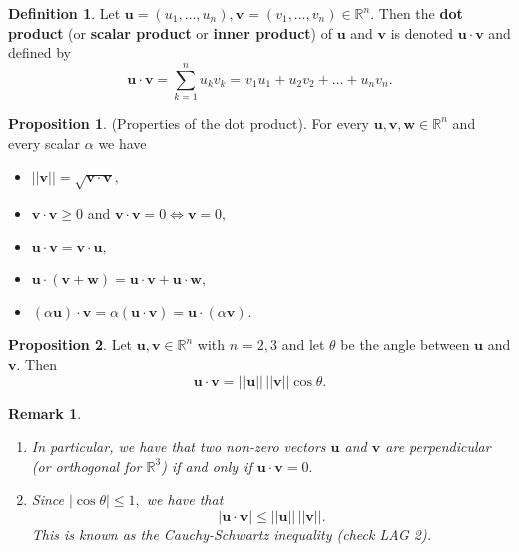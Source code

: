 \documentclass[12pt, a4paper]{article}
\newtheorem*{remark}{Remark}
\theoremstyle{definition}
\newtheorem{definition}{Definition}[section]
\newtheorem{proposition}{Proposition}
\theoremstyle{plain}
\newcommand{\bb}[1]{\mathbb{#1}}
\newcommand{\vect}[1]{\mathbf{#1}}
\begin{document}
\begin{definition} Let $\vect{u}=(u_1,\ldots,u_n), \vect{v}=(v_1,\ldots,v_n) \in \bb{R}^n.$ Then the \textbf{dot product} (or \textbf{scalar product} or \textbf{inner product}) of $\vect{u}$ and $\vect{v}$ is denoted $\vect{u}\cdot \vect{v}$ and defined by $$\vect{u}\cdot\vect{v} = \sum_{k=1}^{n}u_kv_k =v_1u_1+u_2v_2+\ldots+u_nv_n.$$ \end{definition}

\begin{proposition} (Properties of the dot product). For every $\vect{u},\vect{v},\vect{w} \in \bb{R}^n$ and every scalar $\alpha$ we have 

\begin{itemize}

	\item $||\vect{v}||= \sqrt{\vect{v}\cdot \vect{v}},$

	\item $\vect{v}\cdot\vect{v} \geq0$ and $\vect{v}\cdot\vect{v}=0 \iff \vect{v}=0,$

	\item $\vect{u}\cdot\vect{v}=\vect{v}\cdot\vect{u},$

	\item $\vect{u}\cdot(\vect{v+w}) = \vect{u\cdot v}+ \vect{u\cdot w },$

	\item $(\alpha\vect{u})\cdot \vect{v}=\alpha(\vect{u \cdot v}) = \vect{u} \cdot (\alpha \vect{v}).$

\end{itemize}

\end{proposition}

\begin{proposition} Let $\vect{u},\vect{v} \in \bb{R}^n$ with $n=2,3$ and let $\theta$ be the angle between $\vect{u}$ and $\vect{v}.$ Then $$\vect{u\cdot v} = ||\vect{u}|| \, ||\vect{v}||\cos{\theta}.$$ \end{proposition}

\begin{remark} \hphantom{This is to make the text look nice.}
\begin{enumerate}
	
	\item In particular, we have that two non-zero vectors $\vect{u}$ and $\vect{v}$ are perpendicular (or \textit{orthogonal} for $\bb{R}^3$) if and only if $\vect{u\cdot v}=0.$

	\item Since $|\cos{\theta}|\leq 1,$ we have that $$|\vect{u\cdot v}|\leq ||\vect{u}|| \, ||\vect{v}||.$$ This is known as the \textit{Cauchy-Schwartz} inequality (check LAG 2).

\end{enumerate}
\end{remark} 
\end{document}
